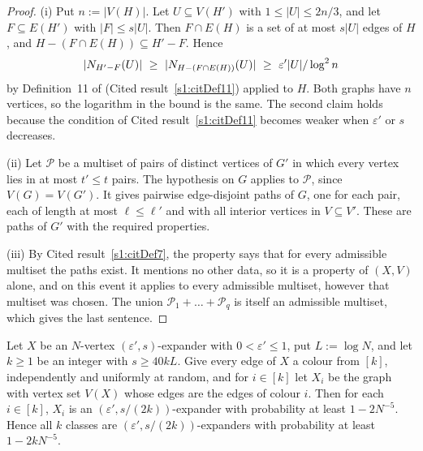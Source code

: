 \begin{proof}
(i) Put $n:=|V(H)|$. Let $U\subseteq V(H')$ with $1\le|U|\le 2n/3$, and
let $F\subseteq E(H')$ with $|F|\le s|U|$. Then $F\cap E(H)$ is a set of
at most $s|U|$ edges of $H$, and $H-(F\cap E(H))\subseteq H'-F$. Hence
\[
|\Nbr_{H'-F}(U)|\ \ge\ |\Nbr_{H-(F\cap E(H))}(U)|\ \ge\ \varepsilon'|U|/\log^2 n
\]
by Definition~11 of \cite{BM} (Cited result~\ref{s1:citDef11}) applied to $H$.
Both graphs have $n$ vertices, so the logarithm in the bound is the same.
The second claim holds because the condition of Cited result~\ref{s1:citDef11}
becomes weaker when $\varepsilon'$ or $s$ decreases.

(ii) Let $\mathcal P$ be a multiset of pairs of distinct vertices of
$G'$ in which every vertex lies in at most $t'\le t$ pairs. The
hypothesis on $G$ applies to $\mathcal P$, since $V(G)=V(G')$. It gives
pairwise edge-disjoint paths of $G$, one for each pair, each of length at
most $\ell\le\ell'$ and with all interior vertices in $V\subseteq V'$.
These are paths of $G'$ with the required properties.

(iii) By Cited result~\ref{s1:citDef7}, the property says that for every
admissible multiset the paths exist. It mentions no other data, so it is
a property of $(X,V)$ alone, and on this event it applies to every
admissible multiset, however that multiset was chosen. The union
$\mathcal P_1+\dots+\mathcal P_q$ is itself an admissible multiset, which
gives the last sentence.
\end{proof}

\begin{lemma}\label{s3:lemL15p}
Let $X$ be an $N$-vertex $(\varepsilon',s)$-expander with
$0<\varepsilon'\le1$, put $L:=\log N$, and let $k\ge1$ be an integer with
$s\ge 40kL$. Give every edge of $X$ a colour from $[k]$, independently
and uniformly at random, and for $i\in[k]$ let $X_i$ be the graph with
vertex set $V(X)$ whose edges are the edges of colour $i$. Then for each
$i\in[k]$, $X_i$ is an $(\varepsilon',s/(2k))$-expander with probability
at least $1-2N^{-5}$. Hence all $k$ classes are
$(\varepsilon',s/(2k))$-expanders with probability at least $1-2kN^{-5}$.
\deps{\ref{s1:citDef11}, \ref{s1:citChernoff}}
\end{lemma}

